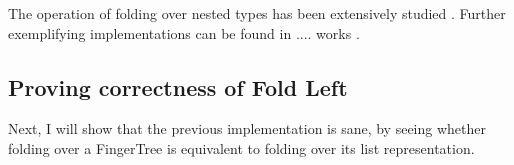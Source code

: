 \documentclass[12pt,twoside,notitlepage]{report}
\begin{document}
The operation of folding over nested types has been extensively studied \cite{nestedhinze}. Further exemplifying  implementations can be found in .... works \cite{debrujin}.

\subsection{Proving correctness of Fold Left}

Next, I will show that the previous implementation is sane, by seeing whether folding over a FingerTree is equivalent to folding over its list representation.

\begin{code}
\\
\> \AgdaSymbol{:}  \AgdaSymbol{\{}\AgdaSymbol{\}} \AgdaSymbol{\{} \AgdaSymbol{:}  \AgdaSymbol{\}\{} \AgdaSymbol{:}  \AgdaSymbol{\}}\<%
\\
\>[2]\<[14]%
\>[14]\AgdaSymbol{\{} \AgdaSymbol{:}  \AgdaSymbol{\}}\<%
\\
\>[2]\<[14]%
\>[14]  \AgdaSymbol{:}   \<%
\\
\>[2]\<[14]%
\>[14]  \AgdaSymbol{:}    \<%
\\
\>[2]\<[14]%
\>[14] \AgdaSymbol{\{} \AgdaSymbol{:} \AgdaSymbol{\}}\<%
\\
\>[2]\<[14]%
\>[14] \AgdaSymbol{(} \AgdaSymbol{:}     \AgdaSymbol{)}\<%
\\
\>[2]\<[14]%
\>[14] \AgdaSymbol{(} \AgdaSymbol{:} \AgdaSymbol{)}\<%
\\
\>[2]\<[14]%
\>[14] \AgdaSymbol{(} \AgdaSymbol{:}    \AgdaSymbol{\{}\AgdaSymbol{\})}\<%
\\
\>[2]\<[14]%
\>[14] \AgdaSymbol{(}        \AgdaSymbol{(} \AgdaSymbol{))}\<%
\\
\end{code}
\end{document}
